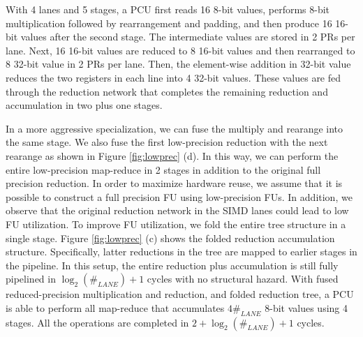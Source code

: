 With 4 lanes and 5 stages,
  a PCU first reads 16 8-bit values,
  performs 8-bit multiplication followed by rearrangement and padding,
  and then produce 16 16-bit values after the second stage.
The intermediate values are stored in 2 PRs per lane.
Next, 16 16-bit values are reduced to 8 16-bit values
  and then rearranged to 8 32-bit value in 2 PRs per lane.
Then, the element-wise addition in 32-bit value
  reduces the two registers in each line into 4 32-bit values.
These values are fed through the
  reduction network that completes the remaining
  reduction and accumulation in two plus one stages.

In a more aggressive specialization,
  we can fuse the multiply and rearange into the same stage.
We also fuse the first low-precision reduction with the next rearange as shown in Figure \ref{fig:lowprec} (d).
In this way, we can perform the entire low-precision map-reduce in 2 stages
  in addition to the original full precision reduction.
In order to maximize hardware reuse,
  we assume that it is possible to construct a full precision FU
  using low-precision FUs.
In addition, we observe that the original reduction network in the SIMD lanes
  could lead to low FU utilization.
To improve FU utilization, we fold the entire tree structure in a single stage.
Figure \ref{fig:lowprec} (c) shows the folded reduction accumulation structure.
Specifically, latter reductions in the tree are mapped to earlier stages in the pipeline.
In this setup, the entire reduction plus accumulation
  is still fully pipelined in $\log_2(\#_{LANE})+1$ cycles
  with no structural hazard.
With fused reduced-precision multiplication and reduction, and folded reduction tree,
  a PCU is able to perform all map-reduce that accumulates $4 \#_{LANE}$
  8-bit values using 4 stages.
All the operations are completed in $2+\log_2(\#_{LANE})+1$ cycles.

